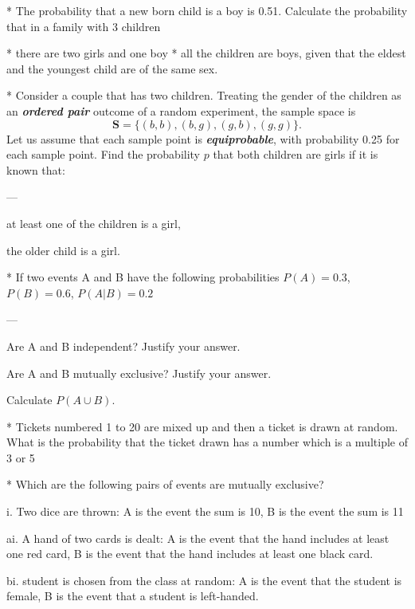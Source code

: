 * The probability that a new born child is a boy is 0.51. Calculate the probability that in a family with 3 children
\begin{enumerate}[(i)]
* there are two girls and one boy
* all the children are boys, given that the eldest and the youngest child are of the same sex.
\end{enumerate}

* 
Consider a couple that has two children. Treating the gender of the children as an \textit{\textbf{ordered pair}} outcome of a random experiment, the sample space is 
\[\boldsymbol{S} = \{ (b,b), (b,g), (g,b), (g,g)\}.\]
Let us assume that each sample point is \textit{\textbf{equiprobable}}, with probability 0.25 for each sample point.
Find the probability $p$ that both children are girls if it is known that: 

--- 
\item[(a)] at least one of the children is a girl,
\item[(b)] the older child is a girl. 


* 
If two events A and B have the following probabilities $P(A) = 0.3$, $P(B) = 0.6$, $P(A|B) = 0.2$

--- 
\item[(i)] Are A and B independent? Justify your answer.
\item[(ii)] Are A and B mutually exclusive? Justify your answer.
\item[(iii)] Calculate $P(A \cup B)$.






* Tickets numbered 1 to 20 are mixed up and then a ticket is drawn at random. What is the probability that the ticket drawn has a number which is a multiple of 3 or 5

* 
Which are the following pairs of events are mutually exclusive?

i.
Two dice are thrown: A is the event the sum is 10, B is the event the sum is 11


ai.
A hand of two cards is dealt: A is the event that the hand includes at least one red card, B is the event that the hand includes at least one black card.


bi.
student is chosen from the class at random: A is the event that the student is female, B is the event that a student is left-handed.






